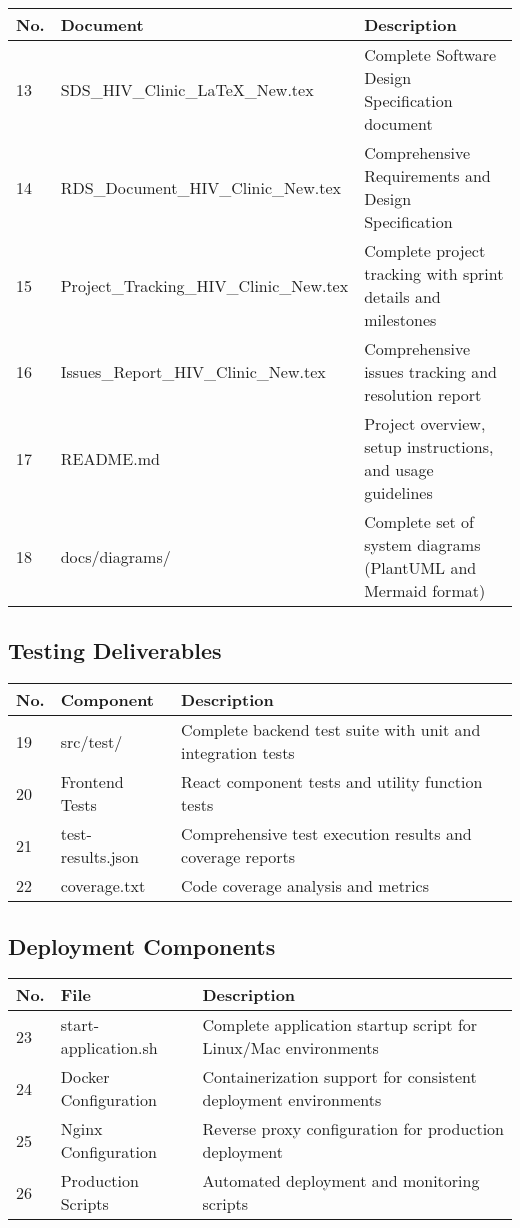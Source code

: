 \documentclass[12pt,a4paper]{article}
\begin{document}
\begin{longtable}{|p{1cm}|p{6cm}|p{7cm}|}
\hline
\textbf{No.} & \textbf{Document} & \textbf{Description} \\
\hline
13 & SDS\_HIV\_Clinic\_LaTeX\_New.tex & Complete Software Design Specification document \\
\hline
14 & RDS\_Document\_HIV\_Clinic\_New.tex & Comprehensive Requirements and Design Specification \\
\hline
15 & Project\_Tracking\_HIV\_Clinic\_New.tex & Complete project tracking with sprint details and milestones \\
\hline
16 & Issues\_Report\_HIV\_Clinic\_New.tex & Comprehensive issues tracking and resolution report \\
\hline
17 & README.md & Project overview, setup instructions, and usage guidelines \\
\hline
18 & docs/diagrams/ & Complete set of system diagrams (PlantUML and Mermaid format) \\
\hline
\end{longtable}

\subsection{Testing Deliverables}

\begin{longtable}{|p{1cm}|p{6cm}|p{7cm}|}
\hline
\textbf{No.} & \textbf{Component} & \textbf{Description} \\
\hline
19 & src/test/ & Complete backend test suite with unit and integration tests \\
\hline
20 & Frontend Tests & React component tests and utility function tests \\
\hline
21 & test-results.json & Comprehensive test execution results and coverage reports \\
\hline
22 & coverage.txt & Code coverage analysis and metrics \\
\hline
\end{longtable}

\subsection{Deployment Components}

\begin{longtable}{|p{1cm}|p{6cm}|p{7cm}|}
\hline
\textbf{No.} & \textbf{File} & \textbf{Description} \\
\hline
23 & start-application.sh & Complete application startup script for Linux/Mac environments \\
\hline
24 & Docker Configuration & Containerization support for consistent deployment environments \\
\hline
25 & Nginx Configuration & Reverse proxy configuration for production deployment \\
\hline
26 & Production Scripts & Automated deployment and monitoring scripts \\
\hline
\end{longtable}
\end{document}
